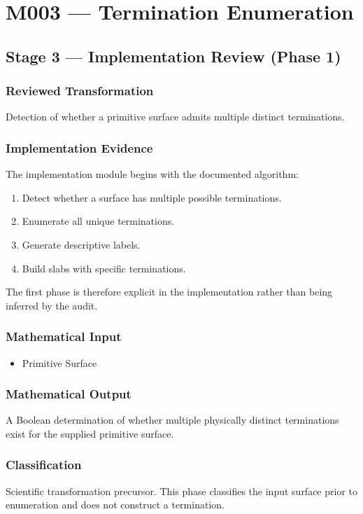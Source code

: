 \chapter{M003 --- Termination Enumeration}

\section{Stage 3 --- Implementation Review (Phase 1)}

\subsection{Reviewed Transformation}

Detection of whether a primitive surface admits multiple distinct
terminations.

\subsection{Implementation Evidence}

The implementation module begins with the documented algorithm:

\begin{enumerate}
\item Detect whether a surface has multiple possible terminations.
\item Enumerate all unique terminations.
\item Generate descriptive labels.
\item Build slabs with specific terminations.
\end{enumerate}

The first phase is therefore explicit in the implementation rather than
being inferred by the audit.

\subsection{Mathematical Input}

\begin{itemize}
\item Primitive Surface
\end{itemize}

\subsection{Mathematical Output}

A Boolean determination of whether multiple physically distinct
terminations exist for the supplied primitive surface.

\subsection{Classification}

Scientific transformation precursor. This phase classifies the input
surface prior to enumeration and does not construct a termination.
